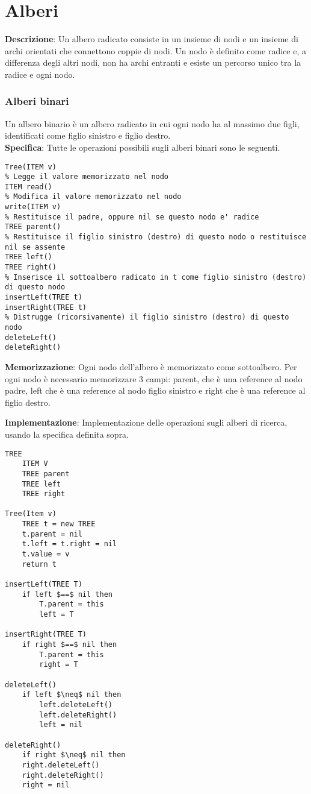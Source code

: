\documentclass[../cheatSheetAlgoritmi.tex]{subfiles}
\begin{document}
\chapter{Alberi}
\textbf{Descrizione}: Un albero radicato consiste in un insieme di nodi e un insieme di archi orientati che connettono coppie di nodi. Un nodo è definito come radice e, a differenza degli altri nodi, non ha archi entranti e esiste un percorso unico tra la radice e ogni nodo.

\subsection{Alberi binari}
Un albero binario è un albero radicato in cui ogni nodo ha al massimo due figli, identificati come figlio sinistro e figlio destro.\\
\textbf{Specifica}: Tutte le operazioni possibili sugli alberi binari sono le seguenti. 
\begin{lstlisting}[caption= Specifica albero binario]
% Costruisce un nuovo nodo, contenente v, senza figli o genitori
Tree(ITEM v)
% Legge il valore memorizzato nel nodo
ITEM read()
% Modifica il valore memorizzato nel nodo
write(ITEM v)
% Restituisce il padre, oppure nil se questo nodo e' radice
TREE parent()
% Restituisce il figlio sinistro (destro) di questo nodo o restituisce nil se assente
TREE left()
TREE right()
% Inserisce il sottoalbero radicato in t come figlio sinistro (destro) di questo nodo
insertLeft(TREE t)
insertRight(TREE t)
% Distrugge (ricorsivamente) il figlio sinistro (destro) di questo nodo
deleteLeft()
deleteRight()
\end{lstlisting}
\newpage
\begin{flushleft}
\textbf{Memorizzazione}: Ogni nodo dell'albero è memorizzato come sottoalbero. Per ogni nodo è necessario memorizzare 3 campi: parent, che è una reference al nodo padre, left che è una reference al nodo figlio sinistro e right che è una reference al figlio destro.
\end{flushleft}
\textbf{Implementazione}: Implementazione delle operazioni sugli alberi di ricerca, usando la specifica definita sopra. 
\begin{lstlisting}[caption= Implentazione alberi binari]
TREE
	ITEM V	
	TREE parent
	TREE left
	TREE right

Tree(Item v)
	TREE t = new TREE
	t.parent = nil
	t.left = t.right = nil
	t.value = v
	return t
	
insertLeft(TREE T)
	if left $==$ nil then
		T.parent = this
		left = T
		
insertRight(TREE T)
	if right $==$ nil then
		T.parent = this
		right = T
		
deleteLeft()
	if left $\neq$ nil then
		left.deleteLeft()
		left.deleteRight()
		left = nil
		
deleteRight()
	if right $\neq$ nil then
	right.deleteLeft()
	right.deleteRight()
	right = nil
\end{lstlisting}
\newpage
\end{document}
